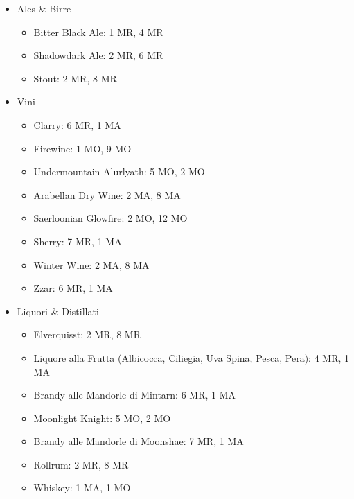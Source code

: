 \documentclass{article}
\begin{document}
\begin{itemize}
\begin{itemize}
                    \item {Ales \& Birre}
                    \begin{itemize}
                        \item Bitter Black Ale: 1 MR, 4 MR
                        \item Shadowdark Ale: 2 MR, 6 MR
                        \item Stout: 2 MR, 8 MR
                    \end{itemize}

                    \item Vini
                    \begin{itemize}
                        \item Clarry: 6 MR, 1 MA
                        \item Firewine: 1 MO, 9 MO
                        \item Undermountain Alurlyath: 5 MO, 2 MO
                        \item Arabellan Dry Wine: 2 MA, 8 MA
                        \item Saerloonian Glowfire: 2 MO, 12 MO
                        \item Sherry: 7 MR, 1 MA
                        \item Winter Wine: 2 MA, 8 MA
                        \item Zzar: 6 MR, 1 MA
                    \end{itemize}

                    \item Liquori \& Distillati
                    \begin{itemize}
                        \item Elverquisst: 2 MR, 8 MR
                        \item Liquore alla Frutta (Albicocca, Ciliegia, Uva Spina, Pesca, Pera): 4 MR, 1 MA
                        \item Brandy alle Mandorle di Mintarn: 6 MR, 1 MA
                        \item Moonlight Knight: 5 MO, 2 MO
                        \item Brandy alle Mandorle di Moonshae: 7 MR, 1 MA
                        \item Rollrum: 2 MR, 8 MR
                        \item Whiskey: 1 MA, 1 MO
                    \end{itemize}


\end{itemize}
\end{itemize}
\end{document}
